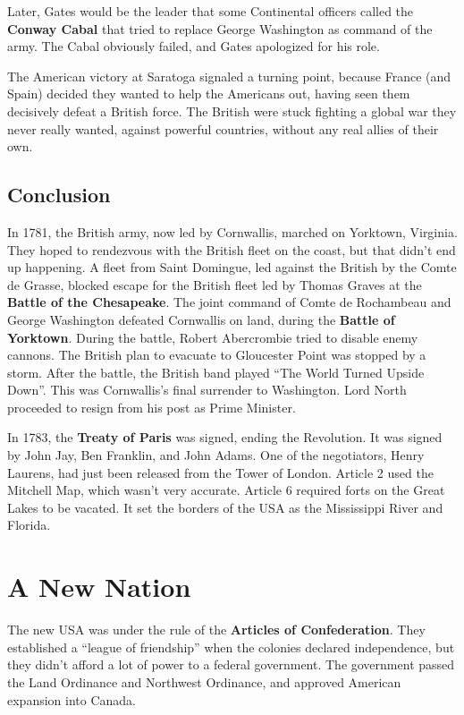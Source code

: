 Later, Gates would be the leader that some Continental officers called the \textbf{Conway Cabal}
that tried to replace George Washington as command of the army.
The Cabal obviously failed, and Gates apologized for his role.

The American victory at Saratoga signaled a turning point,
because France (and Spain) decided they wanted to help the Americans out,
having seen them decisively defeat a British force.
The British were stuck fighting a global war they never really wanted,
against powerful countries, without any real allies of their own.

\subsection*{Conclusion}

In 1781, the British army, now led by Cornwallis, marched on Yorktown, Virginia.
They hoped to rendezvous with the British fleet on the coast,
but that didn't end up happening.
A fleet from Saint Domingue, led against the British by the Comte de Grasse, blocked escape for the
British fleet led by Thomas Graves at the \textbf{Battle of the Chesapeake}.
The joint command of Comte de Rochambeau and George Washington defeated Cornwallis
on land, during the \textbf{Battle of Yorktown}.
During the battle, Robert Abercrombie tried to disable enemy cannons.
The British plan to evacuate to Gloucester Point was stopped by a storm.
After the battle, the British band played ``The World Turned Upside Down''.
This was Cornwallis's final surrender to Washington.
Lord North proceeded to resign from his post as Prime Minister.

In 1783, the \textbf{Treaty of Paris} was signed, ending the Revolution.
It was signed by John Jay, Ben Franklin, and John Adams.
One of the negotiators, Henry Laurens, had just been released from the Tower of London.
Article 2 used the Mitchell Map, which wasn't very accurate.
Article 6 required forts on the Great Lakes to be vacated.
It set the borders of the USA as the Mississippi River and Florida.

\section{A New Nation}

The new USA was under the rule of the \textbf{Articles of Confederation}.
They established a ``league of friendship'' when the colonies declared independence,
but they didn't afford a lot of power to a federal government.
The government passed the Land Ordinance and Northwest Ordinance,
and approved American expansion into Canada.

